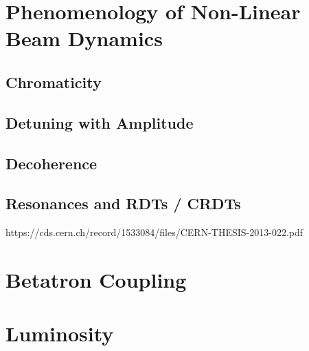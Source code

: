 
\section{Phenomenology of Non-Linear Beam Dynamics}

\subsection{Chromaticity}

\subsection{Detuning with Amplitude}

\subsection{Decoherence}

\subsection{Resonances and RDTs / CRDTs}

https://cds.cern.ch/record/1533084/files/CERN-THESIS-2013-022.pdf


\section{Betatron Coupling}


\section{Luminosity}

